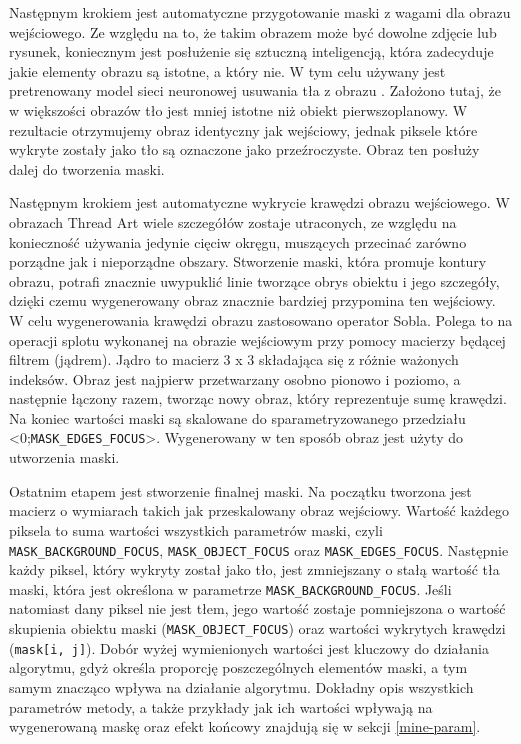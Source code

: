     Następnym krokiem jest automatyczne przygotowanie maski z wagami dla obrazu wejściowego. Ze względu na to, że takim obrazem może być dowolne zdjęcie lub rysunek, koniecznym jest posłużenie się sztuczną inteligencją, która zadecyduje jakie elementy obrazu są istotne, a który nie. W tym celu używany jest pretrenowany model sieci neuronowej usuwania tła z obrazu \cite{rembg}. Założono tutaj, że w większości obrazów tło jest mniej istotne niż obiekt pierwszoplanowy. W rezultacie otrzymujemy obraz identyczny jak wejściowy, jednak piksele które wykryte zostały jako tło są oznaczone jako przeźroczyste. Obraz ten posłuży dalej do tworzenia maski.
    
    Następnym krokiem jest automatyczne wykrycie krawędzi obrazu wejściowego. W obrazach Thread Art wiele szczegółów zostaje utraconych, ze względu na konieczność używania jedynie cięciw okręgu, muszących przecinać zarówno porządne jak i nieporządne obszary. Stworzenie maski, która promuje kontury obrazu, potrafi znacznie uwypuklić linie tworzące obrys obiektu i jego szczegóły, dzięki czemu wygenerowany obraz znacznie bardziej przypomina ten wejściowy. W celu wygenerowania krawędzi obrazu zastosowano operator Sobla. Polega to na operacji splotu wykonanej na obrazie wejściowym przy pomocy macierzy będącej filtrem (jądrem). Jądro to macierz 3 x 3 składająca się z różnie ważonych indeksów. Obraz jest najpierw przetwarzany osobno pionowo i poziomo, a następnie łączony razem, tworząc nowy obraz, który reprezentuje sumę krawędzi. Na koniec wartości maski są skalowane do sparametryzowanego przedziału <0;\texttt{MASK_EDGES_FOCUS}>. Wygenerowany w ten sposób obraz jest użyty do utworzenia maski.
    
    Ostatnim etapem jest stworzenie finalnej maski. Na początku tworzona jest macierz o wymiarach takich jak przeskalowany obraz wejściowy. Wartość każdego piksela to suma wartości wszystkich parametrów maski, czyli \texttt{MASK_BACKGROUND_FOCUS}, \texttt{MASK_OBJECT_FOCUS} oraz \texttt{MASK_EDGES_FOCUS}. Następnie każdy piksel, który wykryty został jako tło, jest zmniejszany o stałą wartość tła maski, która jest określona w parametrze \texttt{MASK_BACKGROUND_FOCUS}. Jeśli natomiast dany piksel nie jest tłem, jego wartość zostaje pomniejszona o wartość skupienia obiektu maski (\texttt{MASK_OBJECT_FOCUS}) oraz wartości wykrytych krawędzi (\texttt{mask[i, j]}). Dobór wyżej wymienionych wartości jest kluczowy do działania algorytmu, gdyż określa proporcję poszczególnych elementów maski, a tym samym znacząco wpływa na działanie algorytmu. Dokładny opis wszystkich parametrów metody, a także przykłady jak ich wartości wpływają na wygenerowaną maskę oraz efekt końcowy znajdują się w sekcji \ref{mine-param}. 
    
